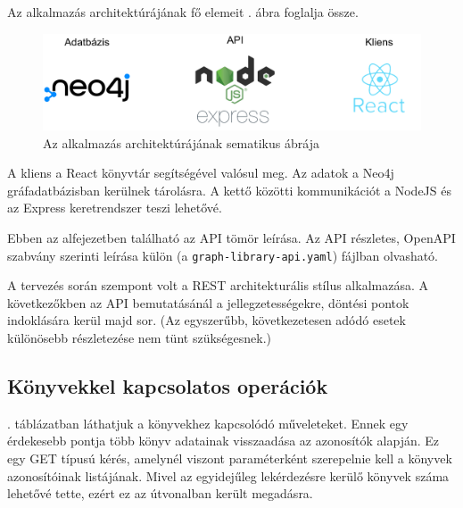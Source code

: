 

Az alkalmazás architektúrájának fő elemeit . ábra foglalja össze.

\begin{figure}[h]
   \centering
   \includegraphics[scale=0.3]{images/graphlibrary_architecture.png}
   \caption{Az alkalmazás architektúrájának sematikus ábrája}
   \label{fig:graphlibrary_architecture}
\end{figure}

A kliens a React könyvtár segítségével valósul meg. Az adatok a Neo4j gráfadatbázisban kerülnek tárolásra. A kettő közötti kommunikációt a NodeJS és az Express keretrendszer teszi lehetővé.


Ebben az alfejezetben található az API tömör leírása. Az API részletes, OpenAPI szabvány szerinti leírása külön (a \texttt{graph-library-api.yaml}) fájlban olvasható.

A tervezés során szempont volt a REST architekturális stílus alkalmazása. A következőkben az API bemutatásánál a jellegzetességekre, döntési pontok indoklására kerül majd sor. (Az egyszerűbb, következetesen adódó esetek különösebb részletezése nem tünt szükségesnek.)

\subsection{Könyvekkel kapcsolatos operációk}

. táblázatban láthatjuk a könyvekhez kapcsolódó műveleteket. Ennek egy érdekesebb pontja több könyv adatainak visszaadása az azonosítók alapján. Ez egy GET típusú kérés, amelynél viszont paraméterként szerepelnie kell a könyvek azonosítóinak listájának. Mivel az egyidejűleg lekérdezésre kerülő könyvek száma lehetővé tette, ezért ez az útvonalban került megadásra.

